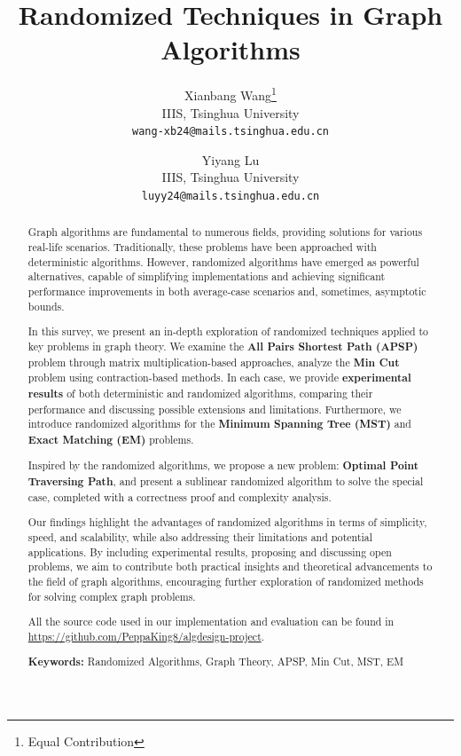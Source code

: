 \documentclass[11pt]{article}
\title{Randomized Techniques in Graph Algorithms}
\author{
    Xianbang Wang\thanks{Equal Contribution} \\
    \fontsize{13}{12}\selectfont
    IIIS, Tsinghua University \\
    \fontsize{13}{12}\selectfont
    \texttt{wang-xb24@mails.tsinghua.edu.cn}
    \and
    Yiyang Lu\footnotemark[1] \\
    \fontsize{13}{12}\selectfont
    IIIS, Tsinghua University \\
    \fontsize{13}{12}\selectfont
    \texttt{luyy24@mails.tsinghua.edu.cn}
}
\date{}
\theoremstyle{plain}
\begin{document}
\maketitle
\begin{abstract}
    

    Graph algorithms are fundamental to numerous fields, providing solutions for various real-life scenarios. Traditionally, these problems have been approached with deterministic algorithms. However, randomized algorithms have emerged as powerful alternatives, capable of simplifying implementations and achieving significant performance improvements in both average-case scenarios and, sometimes, asymptotic bounds.

    In this survey, we present an in-depth exploration of randomized techniques applied to key problems in graph theory. We examine the \textbf{All Pairs Shortest Path (APSP)} problem through matrix multiplication-based approaches, analyze the \textbf{Min Cut} problem using contraction-based methods. In each case, we provide \textbf{experimental results} of both deterministic and randomized algorithms, comparing their performance and discussing possible extensions and limitations. Furthermore, we introduce randomized algorithms for the \textbf{Minimum Spanning Tree (MST)} and \textbf{Exact Matching (EM)} problems. 
    
    Inspired by the randomized algorithms, we propose a new problem: \textbf{Optimal Point Traversing Path}, and present a sublinear randomized algorithm to solve the special case, completed with a correctness proof and complexity analysis.

    Our findings highlight the advantages of randomized algorithms in terms of simplicity, speed, and scalability, while also addressing their limitations and potential applications. By including experimental results, proposing and discussing open problems, we aim to contribute both practical insights and theoretical advancements to the field of graph algorithms, encouraging further exploration of randomized methods for solving complex graph problems.
    
    All the source code used in our implementation and evaluation can be found in \url{https://github.com/PeppaKing8/algdesign-project}.

    \textbf{Keywords:} Randomized Algorithms, Graph Theory, APSP, Min Cut, MST, EM
\end{abstract}
\end{document}
